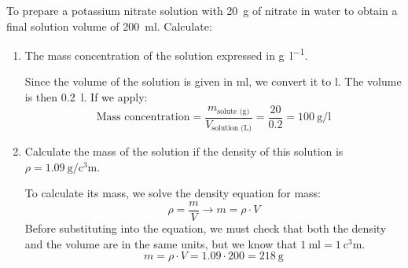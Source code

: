 \begin{example}
    To prepare a potassium nitrate solution with \qty{20}{\g} of nitrate in water to obtain a final solution volume of \qty{200}{\ml}. Calculate:
    \begin{enumerate}[label=\letraminuscula]
\item The mass concentration of the solution expressed in \unit{\g\per\litre}.

Since the volume of the solution is given in \unit{\ml}, we convert it to \unit{\litre}. The volume is then \qty{0.2}{\litre}. If we apply:
\begin{equation*}
    \text{Mass concentration} = \dfrac{m_{\text{solute (g)}}}{V_{\text{solution (L)}}} = \dfrac{20}{0.2} = \qty{100}{\g\per\litre}
\end{equation*}

\item Calculate the mass of the solution if the density of this solution is \( \rho = \qty{1.09}{\g\per\cubic\centi\metre} \).

To calculate its mass, we solve the density equation for mass:
\begin{equation*}
    \rho = \dfrac{m}{V} \rightarrow m = \rho \cdot V
\end{equation*}
Before substituting into the equation, we must check that both the density and the volume are in the same units, but we know that \( \qty{1}{\ml} = \qty{1}{\cubic\centi\metre} \).
\begin{equation*}
    m = \rho \cdot V = 1.09 \cdot 200 = \qty{218}{\g}
\end{equation*}
    \end{enumerate}
\end{example}

